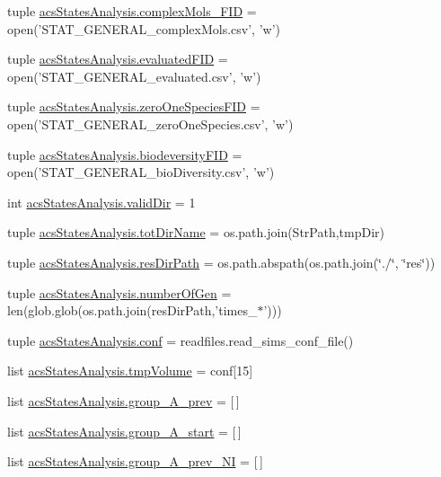 \begin{DoxyCompactItemize}
tuple \hyperlink{a00130_a2ef28958c50aabe7867b32f8dd6f4ace}{acs\-States\-Analysis.\-complex\-Mols\-\_\-\-F\-I\-D} = open('S\-T\-A\-T\-\_\-\-G\-E\-N\-E\-R\-A\-L\-\_\-complex\-Mols.\-csv', 'w')
\item 
tuple \hyperlink{a00130_a2cc9b964c81489c25978be53ab38eb16}{acs\-States\-Analysis.\-evaluated\-F\-I\-D} = open('S\-T\-A\-T\-\_\-\-G\-E\-N\-E\-R\-A\-L\-\_\-evaluated.\-csv', 'w')
\item 
tuple \hyperlink{a00130_a3dc90aca8a97c5995b013887c98d8ce9}{acs\-States\-Analysis.\-zero\-One\-Species\-F\-I\-D} = open('S\-T\-A\-T\-\_\-\-G\-E\-N\-E\-R\-A\-L\-\_\-zero\-One\-Species.\-csv', 'w')
\item 
tuple \hyperlink{a00130_a68c23cb79e89d9e14acf9ed09f46f0e4}{acs\-States\-Analysis.\-biodeversity\-F\-I\-D} = open('S\-T\-A\-T\-\_\-\-G\-E\-N\-E\-R\-A\-L\-\_\-bio\-Diversity.\-csv', 'w')
\item 
int \hyperlink{a00130_aebb18ab2b73e7e2705ee42c728c0a72b}{acs\-States\-Analysis.\-valid\-Dir} = 1
\item 
tuple \hyperlink{a00130_af4bd99f6cdaec32f48ed0074208b4f0c}{acs\-States\-Analysis.\-tot\-Dir\-Name} = os.\-path.\-join(Str\-Path,tmp\-Dir)
\item 
tuple \hyperlink{a00130_ab3da7da39258338965b6eef645a913ee}{acs\-States\-Analysis.\-res\-Dir\-Path} = os.\-path.\-abspath(os.\-path.\-join(\char`\"{}./\char`\"{}, \char`\"{}res\char`\"{}))
\item 
tuple \hyperlink{a00130_a54acb4eba0735e72c2a820383febd37f}{acs\-States\-Analysis.\-number\-Of\-Gen} = len(glob.\-glob(os.\-path.\-join(res\-Dir\-Path,'times\-\_\-$\ast$')))
\item 
tuple \hyperlink{a00130_ab8d1341009c3207d501833ef63593ffa}{acs\-States\-Analysis.\-conf} = readfiles.\-read\-\_\-sims\-\_\-conf\-\_\-file()
\item 
list \hyperlink{a00130_a1d189b8706c1c2299764d3cfd2ba08d9}{acs\-States\-Analysis.\-tmp\-Volume} = conf\mbox{[}15\mbox{]}
\item 
list \hyperlink{a00130_a1dd2f2c85f697e454c99be1a157d6c17}{acs\-States\-Analysis.\-group\-\_\-\-A\-\_\-prev} = \mbox{[}$\,$\mbox{]}
\item 
list \hyperlink{a00130_a3898175300d001a17a60c23656d2812f}{acs\-States\-Analysis.\-group\-\_\-\-A\-\_\-start} = \mbox{[}$\,$\mbox{]}
\item 
list \hyperlink{a00130_a4d77133a6a303d9486944707f3310cf8}{acs\-States\-Analysis.\-group\-\_\-\-A\-\_\-prev\-\_\-\-N\-I} = \mbox{[}$\,$\mbox{]}
\item 

\end{DoxyCompactItemize}
